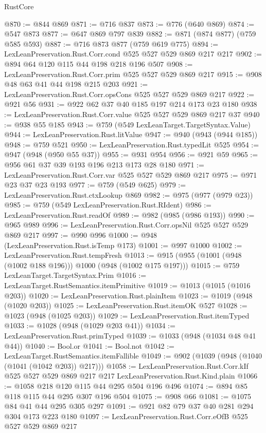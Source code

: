 \begin{lexlean}{RustCore}
\begin{coremodule}
@870 := @844 @869
@871 := @716 @837
@873 := @776 (@640 @869)
@874 := @547 @873
@877 := @647 @869 @797 @839
@882 := @871 (@874 @877) (@759 @585 @593)
@887 := @716 @873 @877 (@759 @619 @775)
@894 := LexLeanPreservation.Rust.Corr.cond @525 @527 @529 @869 @217 @217
@902 := @894 @64 @120 @115 @44 @198 @218 @196 @507
@908 := LexLeanPreservation.Rust.Corr.prim @525 @527 @529 @869 @217
@915 := @908 @48 @63 @41 @44 @198 @215 @203
@921 := LexLeanPreservation.Rust.Corr.opsCons @525 @527 @529 @869 @217
@922 := @921 @56
@931 := @922 @62 @37 @40 @185 @197 @214 @173 @23 @180
@938 := LexLeanPreservation.Rust.Corr.value @525 @527 @529 @869 @217 @37
@940 := @938 @55 @185
@943 := @759 (@549 LexLeanTarget.TargetSyntax.Value)
@944 := LexLeanPreservation.Rust.litValue
@947 := @940 (@943 (@944 @185))
@948 := @759 @521
@950 := LexLeanPreservation.Rust.typedLit @525
@954 := @947 (@948 (@950 @55 @37))
@955 := @931 @954
@956 := @921 @59
@965 := @956 @61 @37 @39 @193 @196 @213 @173 @28 @180
@971 := LexLeanPreservation.Rust.Corr.var @525 @527 @529 @869 @217
@975 := @971 @23 @37 @23 @193
@977 := @759 (@549 @625)
@979 := LexLeanPreservation.Rust.ctxLookup @869
@982 := @975 (@977 (@979 @23))
@985 := @759 (@549 LexLeanPreservation.Rust.RIdent)
@986 := LexLeanPreservation.Rust.readOf
@989 := @982 (@985 (@986 @193))
@990 := @965 @989
@996 := LexLeanPreservation.Rust.Corr.opsNil @525 @527 @529 @869 @217
@997 := @990 @996
@1000 := @948 (LexLeanPreservation.Rust.isTemp @173)
@1001 := @997 @1000
@1002 := LexLeanPreservation.Rust.tempFresh
@1013 := @915 (@955 (@1001 (@948 (@1002 @188 @196))) @1000 (@948 (@1002 @175 @197)))
@1015 := @759 LexLeanTarget.TargetSyntax.Prim
@1016 := LexLeanTarget.RustSemantics.itemPrimitive
@1019 := @1013 (@1015 (@1016 @203))
@1020 := LexLeanPreservation.Rust.plainItem
@1023 := @1019 (@948 (@1020 @203))
@1025 := LexLeanPreservation.Rust.itemOK @527
@1028 := @1023 (@948 (@1025 @203))
@1029 := LexLeanPreservation.Rust.itemTyped
@1033 := @1028 (@948 (@1029 @203 @41))
@1034 := LexLeanPreservation.Rust.primTyped
@1039 := @1033 (@948 (@1034 @48 @41 @44))
@1040 := Bool.or
@1041 := Bool.not
@1042 := LexLeanTarget.RustSemantics.itemFallible
@1049 := @902 (@1039 (@948 (@1040 (@1041 (@1042 @203)) @217)))
@1058 := LexLeanPreservation.Rust.Corr.kIf
    @525
    @527
    @529
    @869
    @217
    @217
    LexLeanPreservation.Rust.Kind.plain
@1066 := @1058 @218 @120 @115 @44 @295 @504 @196 @496
@1074 := @894 @85 @118 @115 @44 @295 @307 @196 @504
@1075 := @908 @66
@1081 := @1075 @84 @41 @44 @295 @305 @297
@1091 := @921 @82 @79 @37 @40 @281 @294 @304 @173 @223 @180
@1097 := LexLeanPreservation.Rust.Corr.eOfB @525 @527 @529 @869 @217

\end{coremodule}
\end{lexlean}
